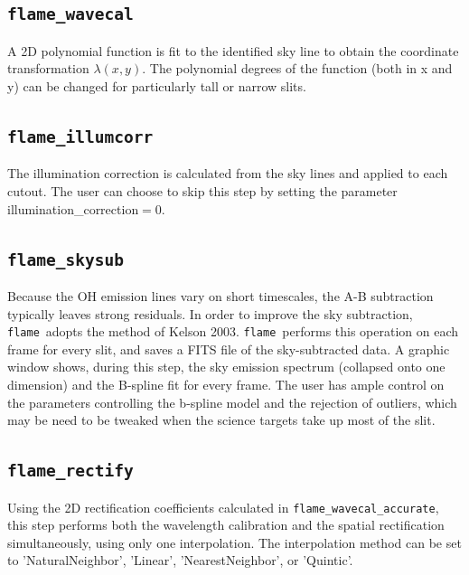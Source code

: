 \documentclass[a4paper]{article}
\newcommand{\flame}{\texttt{flame}}
\begin{document}
\subsection{\texttt{flame\_wavecal}}

A 2D polynomial function is fit to the identified sky line to obtain the coordinate transformation $\lambda(x,y)$. The polynomial degrees of the function (both in x and y) can be changed for particularly tall or narrow slits.


\subsection{\texttt{flame\_illumcorr}}

The illumination correction is calculated from the sky lines and applied to each cutout. The user can choose to skip this step by setting the parameter illumination\_correction$=0$.


\subsection{\texttt{flame\_skysub}}

Because the OH emission lines vary on short timescales, the A-B subtraction typically leaves strong residuals. In order to improve the sky subtraction, \flame\ adopts the method of Kelson 2003. \flame\ performs this operation on each frame for every slit, and saves a FITS file of the sky-subtracted data. A graphic window shows, during this step, the sky emission spectrum (collapsed onto one dimension) and the B-spline fit for every frame. The user has ample control on the parameters controlling the b-spline model and the rejection of outliers, which may be need to be tweaked when the science targets take up most of the slit.


\subsection{\texttt{flame\_rectify}}

Using the 2D rectification coefficients calculated in \texttt{flame\_wavecal\_accurate}, this step performs both the wavelength calibration and the spatial rectification simultaneously, using only one interpolation. The interpolation method can be set to 'NaturalNeighbor', 'Linear', 'NearestNeighbor', or 'Quintic'.
\end{document}
